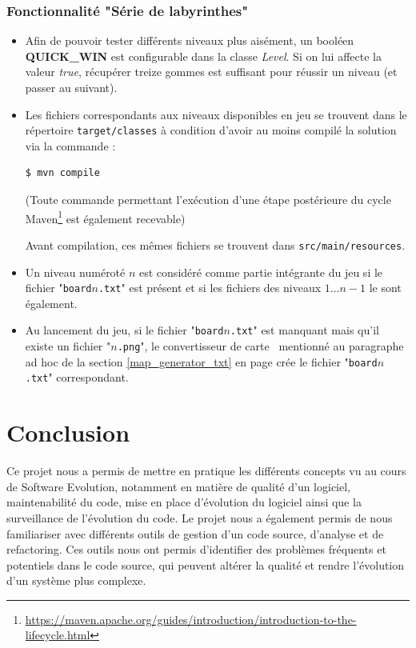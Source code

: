 \documentclass[12pt, openany]{report}
\begin{document}
\subsubsection{Fonctionnalité "Série de labyrinthes"}
\begin{itemize}
	\item Afin de pouvoir tester différents niveaux plus aisément, un booléen \mbox{\textbf{QUICK\_WIN}} est configurable dans la classe \mbox{\textit{Level}}.
	Si on lui affecte la valeur \textit{true}, récupérer treize gommes est suffisant pour réussir un niveau (et passer au suivant).
	\item Les fichiers correspondants aux niveaux disponibles en jeu se trouvent dans le répertoire \nolinkurl{target/classes} à condition d'avoir au moins \og compilé \fg la solution via la commande :
	\begin{lstlisting}[language=bash]
	$ mvn compile
	\end{lstlisting}
	(Toute commande permettant l'exécution d'une étape postérieure du cycle Maven\footnote{\url{https://maven.apache.org/guides/introduction/introduction-to-the-lifecycle.html}} est également recevable)
	
	Avant compilation, ces mêmes fichiers se trouvent dans \nolinkurl{src/main/resources}.
	\item Un niveau numéroté $n$ est considéré comme partie intégrante du jeu si le fichier "\nolinkurl{board}$n$\nolinkurl{.txt}" est présent et si les fichiers des niveaux $1...n-1$ le sont également.
	\item Au lancement du jeu, si le fichier "\nolinkurl{board}$n$\nolinkurl{.txt}" est manquant mais qu'il existe un fichier "$n$\nolinkurl{.png}", le \og convertisseur de carte \fg \,  mentionné au paragraphe ad hoc de la section \ref{map_generator_txt} en page \pageref{map_generator_txt} crée le fichier "\nolinkurl{board}$n$\nolinkurl{.txt}" correspondant.
\end{itemize}

\section{Conclusion}

Ce projet nous a permis de mettre en pratique les différents concepts vu au cours de Software Evolution, notamment en matière de qualité d'un logiciel, maintenabilité du code, mise en place d'évolution du logiciel ainsi que la surveillance de l'évolution du code. Le projet nous a également permis de nous familiariser avec différents outils de gestion d'un code source, d'analyse et de refactoring. Ces outils nous ont permis d'identifier des problèmes fréquents et potentiels dans le code source, qui peuvent altérer la qualité et rendre l'évolution d'un système plus complexe.
\end{document}
